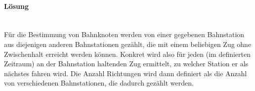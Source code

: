 \paragraph{Lösung}~\\
Für die Bestimmung von Bahnknoten werden von einer gegebenen Bahnstation aus diejenigen anderen Bahnstationen gezählt, die mit einem beliebigen Zug ohne Zwischenhalt erreicht werden können.
Konkret wird also für jeden (im definierten Zeitraum) an der Bahnstation haltenden Zug ermittelt, zu welcher Station er als nächstes fahren wird.
Die Anzahl Richtungen wird dann definiert als die Anzahl von verschiedenen Bahnstationen, die dadurch gezählt werden.
